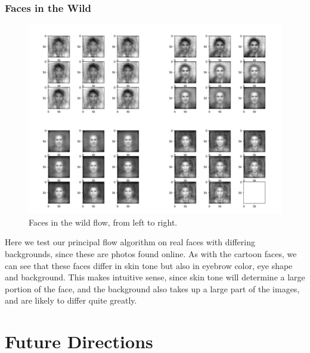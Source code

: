 \documentclass[12pt]{report}
\begin{document}
\subsection{Faces in the Wild}
\begin{figure}[ht]
    \begin{center}
        \includegraphics[scale=0.2]{main_lfw_10_05.png}
        \caption{Faces in the wild flow, from left to right.}
        \label{fig:cartoonfaceflows}
    \end{center}
\end{figure}

Here we test our principal flow algorithm on real faces with differing backgrounds, 
since these are photos found online. As with the cartoon faces, we can see that
these faces differ in skin tone but also in eyebrow color, eye shape and background. 
This makes intuitive sense, since skin tone will determine a large portion of the face,
and the background also takes up a large part of the images, and are likely to differ 
quite greatly.
\fi

\chapter*{Future Directions}
\end{document}

